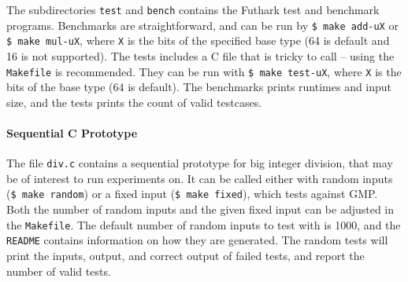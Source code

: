 The subdirectories \texttt{test} and \texttt{bench} contains the Futhark test
and benchmark programs. Benchmarks are straightforward, and can be run by
\texttt{\$ make add-uX} or \texttt{\$ make mul-uX}, where \texttt{X} is the bits
of the specified base type (64 is default and 16 is not supported).  The tests
includes a C file that is tricky to call -- using the \texttt{Makefile} is
recommended. They can be run with \texttt{\$ make test-uX}, where \texttt{X} is
the bits of the base type (64 is default). The benchmarks prints runtimes and
input size, and the tests prints the count of valid testcases.

\paragraph{Sequential C Prototype}
The file \texttt{div.c} contains a sequential prototype for big integer
division, that may be of interest to run experiments on. It can be called either
with random inputs (\texttt{\$ make random}) or a fixed input (\texttt{\$ make
  fixed}), which tests against GMP. Both the number of random inputs and the
given fixed input can be adjusted in the \texttt{Makefile}. The default number
of random inputs to test with is 1000, and the \texttt{README} contains
information on how they are generated. The random tests will print the inputs,
output, and correct output of failed tests, and report the number of valid tests.

